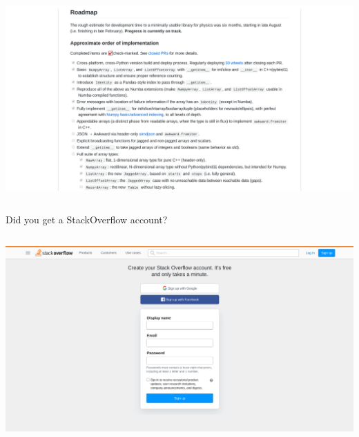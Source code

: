\documentclass[aspectratio=169]{beamer}
\begin{document}
\begin{frame}{}
\vspace{-0.02 cm}
\begin{columns}
\includegraphics[width=\linewidth]{awkward-roadmap.png}
\end{columns}
\end{frame}

\begin{frame}{Did you get a StackOverflow account?}
\vspace{0.15 cm}
\begin{columns}
\includegraphics[width=\linewidth]{stackoverflow-signup.png}
\end{columns}
\end{frame}
\end{document}

